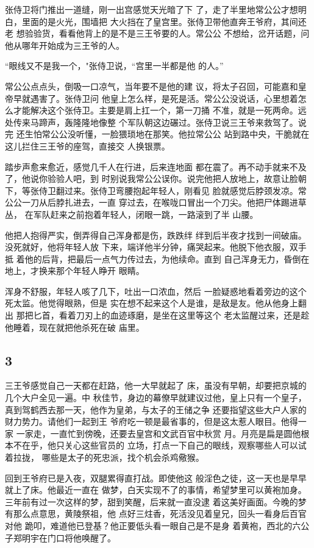 张侍卫将门推出一道缝，刚一出宫感觉天光暗了下
了，走了半里地常公公才想明白，里面的是火光，围墙把
大火挡在了皇宫里。张侍卫带他直奔王爷府，其间还老
想验验货，看看他背上的是不是三王爷要的人。常公公
不想给，岔开话题，问他从哪年开始成为三王爷的人。

“眼线又不是我一个，"张侍卫说，“宫里一半都是他
的人。”

常公公点点头，倒吸一口凉气，当年要不是他的建
议，将太子召回，可能嘉和皇帝早就遇害了。张侍卫问
他皇上怎么样，是死是活。常公公没说话，心里想着怎
么才能解决这个张侍卫。主要是肩上扛一个，第一刀捅
不准，就是一死两命。远处传来马蹄声，轰隆隆地像整
个军队朝这边碾过。张侍卫说三王爷来救驾了。说完
还生怕常公公没听懂，一脸猥琐地在那笑。他拉常公公
站到路中央，干脆就在这儿拦住三王爷的座驾，直接交
人换银票。

踏步声愈来愈近，感觉几千人在行进，后来连地面
都在震了。再不动手就来不及了，他说你验验人吧，到
时别说我常公公误你。说完他把人放地上，故意让脸朝
下，等张侍卫翻过来。张侍卫弯腰抱起年轻人，刚看见
脸就感觉后脖颈发凉。常公公一刀从后脖扎进去，一直
穿过去，在喉咙口冒出一个刀尖。他把尸体踢进草丛，
在军队赶来之前抱着年轻人，闭眼一跳，一路滚到了半
山腰。

他把人抱得严实，倒弄得自己浑身都是伤，跌跌绊
绊到后半夜才找到一间破庙。没死就好，他将年轻人放
下来，端详他半分钟，痛哭起来。他脱下他衣服，双手抵
着他的后背，把最后一点气力传过去，为他续命。直到
自己浑身无力，昏倒在地上，才换来那个年轻人睁开
眼睛。

浑身不舒服，年轻人咳了几下，吐出一口浓血，然后
一脸疑惑地看着旁边的这个死太监。他觉得眼熟，但是
实在想不起来这个人是谁，是敌是友。他从他身上翻出
那把匕首，看着刀刃上的血迹琢磨，是坐在这里等这个
老太监醒过来，还是趁他睡着，现在就把他杀死在破
庙里。
\newline

{\centering\subsection{3}}

三王爷感觉自己一天都在赶路，他一大早就起了
床，虽没有早朝，却要把京城的几个大户全见一遍。中
秋佳节，身边的幕僚早就建议过他，皇上只有一个皇子，
真到驾鹤西去那一天，他作为皇弟，与太子的王储之争
还要指望这些大户人家的财力势力。请他们一起到王
爷府吃一顿是最省事的，但是这太惹人眼目。他得一家
一家走，一直忙到傍晚，还要去皇宫和文武百官中秋赏
月。月亮是扁是圆他根本不在乎，他只关心这些官员的
立场，打点一下自己的眼线，观察哪些人可以试着拉拢，
哪些是太子的死忠派，找个机会杀鸡儆猴。

回到王爷府已是入夜，双腿累得直打战。即使他这
般淫色之徒，这一天也是早早就上了床。他最近一直在
做梦，白天实现不了的事情，希望梦里可以黄袍加身。
三年前有过一次这样的梦，甜到笑醒，后来就一直没逮
着这美好画面。今晚的梦有那么点意思，黄陵祭祖，他
点好三炷香，死活没见着皇兄，回头一看身后百官对他
跪叩，难道他已登基？他正要低头看一眼自己是不是身
着黄袍，西北的六公子郑明宇在门口将他唤醒了。

